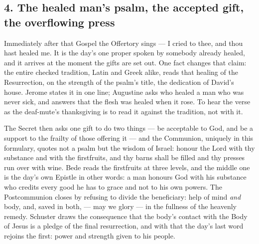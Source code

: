 \subsection*{4. The healed man's psalm, the accepted gift, the overflowing press}

Immediately after that Gospel the Offertory sings  --- I cried to thee, and thou hast healed me. It is the day's one
proper spoken by somebody already healed, and it arrives at the moment the
gifts are set out. One fact changes that claim: the entire checked tradition, Latin and Greek alike,
reads that healing of the Resurrection, on the strength of the psalm's title,
the dedication of David's house. Jerome states it in one line; Augustine asks
who healed a man who was never sick, and answers that the flesh was healed when
it rose. To hear the verse as the deaf-mute's thanksgiving is to read it
against the tradition, not with it.

The Secret then asks one gift to do two things --- be acceptable to God, and be
a support to the frailty of those offering it --- and the Communion, uniquely
in this formulary, quotes not a psalm but the wisdom of Israel: honour the Lord
with thy substance and with the firstfruits, and thy barns shall be filled and
thy presses run over with wine. Bede reads the firstfruits at three levels, and
the middle one is the day's own Epistle in other words: a man honours God with
his substance who credits every good he has to grace and not to his own powers.
The Postcommunion closes by refusing to divide the beneficiary: help of mind
\textit{and} body, and, saved in both,  --- may we glory --- in
the fullness of the heavenly remedy. Schuster draws the consequence that the
body's contact with the Body of Jesus is a pledge of the final resurrection,
and with that the day's last word rejoins the first: power and strength given
to his people.

\label{triptych:brief-synthesis:end}
\clearpage
